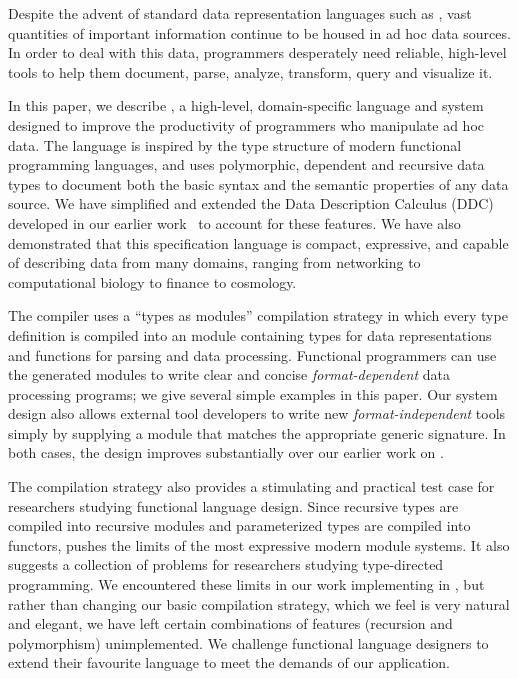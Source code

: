 Despite the advent of standard data representation languages such as
\xml, vast quantities of important information continue to be housed 
in ad hoc data sources.  In order to deal with this data,
programmers desperately need reliable, high-level tools to 
help them document, parse, 
analyze, transform, query and visualize it.  

In this paper, we describe \padsml{}, 
a high-level, domain-specific language and system
designed to improve the productivity of programmers who 
manipulate ad hoc data.  The \padsml{} 
language is inspired by the type structure of modern functional
programming languages, and uses 
polymorphic, dependent and recursive data types to document both the
basic syntax and the semantic properties of any data source.  
We have simplified and extended the Data Description Calculus (DDC) 
developed in
our earlier work~\cite{fisher+:next700ddl} to account for these features.
We have also demonstrated that this specification language
is compact, expressive, and 
capable of describing data from many domains, ranging from
networking to computational biology to finance to cosmology.

The \padsml{} compiler uses a ``types as modules'' compilation strategy
in which every \padsml{} type definition is compiled into
an \ocaml{} module containing types for data representations
and functions for parsing and data processing.  Functional programmers
can use the generated modules to write clear and concise {\em format-dependent}
data processing programs;
we give several simple examples in this paper.  Our system design
also allows external
tool developers to write new {\em format-independent} tools
simply by supplying a module that matches the appropriate generic
signature.  In both cases, the design improves substantially over
our earlier work on \padsc{}.

The \padsml{} compilation strategy also provides a stimulating and
practical test case for researchers studying functional language
design.  Since recursive types are compiled into recursive modules and
parameterized types are compiled into functors, \padsml{} pushes the
limits of the most expressive modern module systems.  It also suggests
a collection of problems for researchers studying type-directed
programming.  We encountered these limits in our work implementing
\padsml{} in
\ocaml, but rather than changing
our basic compilation strategy, which we feel is very natural and elegant,
we have left certain combinations of features (recursion and polymorphism)
unimplemented.
We challenge functional language designers to extend their favourite
language to meet the demands of our application.


